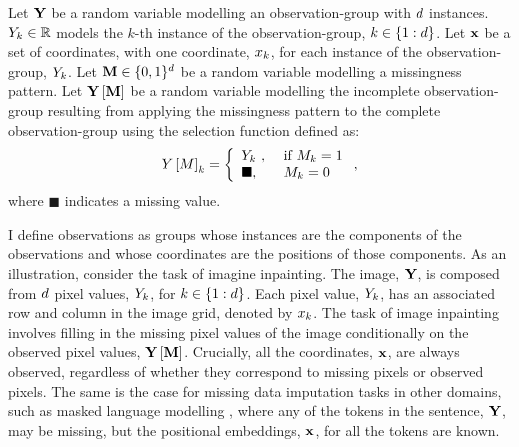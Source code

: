 \documentclass[../thesis.tex]{subfiles}
\begin{document}

Let $\mygroup{\myrv{y}}$ be a random variable modelling an observation-group with $d$ instances. $\myrv{y}_k \in \mathbb{R}$ models the $k$-th instance of the observation-group, $k \in \{1:d\}$. Let $\mathbf{{x}}$ be a set of coordinates, with one coordinate, $x_k$, for each instance of the observation-group, $\myrv{y}_k$. Let $\mygroup{\myrv{m}} \in \{0,1\}^{\mycnt{d}}$ be a random variable modelling a missingness pattern. Let $\mygroup{\myrv{y}} \left[ \mygroup{\myrv{m}} \right]$ be a random variable modelling the incomplete observation-group resulting from applying the missingness pattern to the complete observation-group using the selection function defined as:
\[
    \myrv{y} \left[ \myrv{m} \right]_k = \left\{\begin{array}{ll} \myrv{y}_{k} ~ , ~ &\text{if} ~ \myrv{m}_{k} = 1 \\ \blacksquare, &\myrv{m}_{k} = 0 \end{array}\right.,
\]
where $\blacksquare$ indicates a missing value.

I define observations as groups whose instances are the components of the observations and whose coordinates are the positions of those components. As an illustration, consider the task of imagine inpainting. The image, $\mygroup{\myrv{y}}$, is composed from $d$ pixel values, $\myrv{y}_k$, for $k \in \{1:d\}$. Each pixel value, $\myrv{y}_k$, has an associated row and column in the image grid, denoted by $x_k$. The task of image inpainting involves filling in the missing pixel values of the image conditionally on the observed pixel values, $\mygroup{\myrv{y}} \left[ \mygroup{\myrv{m}} \right]$. Crucially, all the coordinates, $\mathbf{{x}}$, are always observed, regardless of whether they correspond to missing pixels or observed pixels. The same is the case for missing data imputation tasks in other domains, such as masked language modelling \citep{devlinBERTPretrainingDeep2019}, where any of the tokens in the sentence, $\mygroup{\myrv{y}}$, may be missing, but the positional embeddings, $\mathbf{{x}}$, for all the tokens are known.

\end{document}
